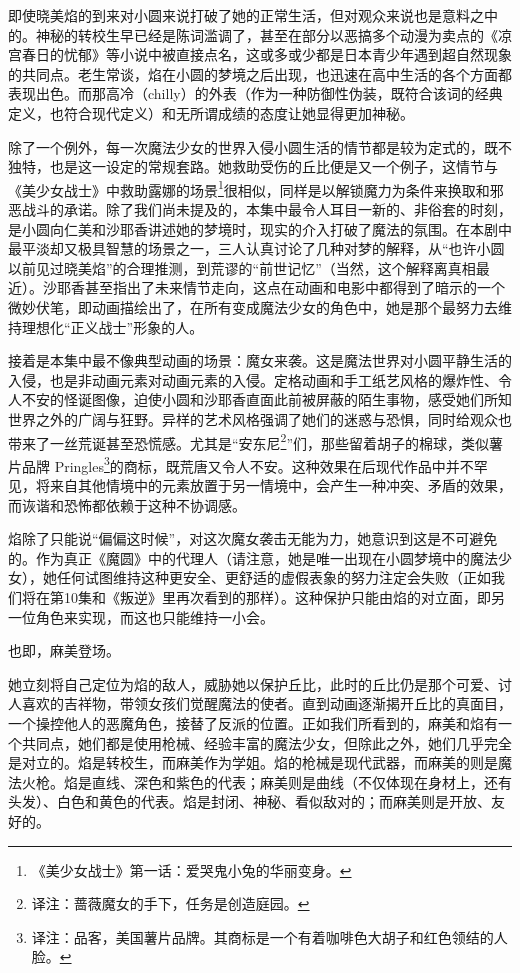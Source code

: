 即使晓美焰的到来对小圆来说打破了她的正常生活，但对观众来说也是意料之中的。神秘的转校生早已经是陈词滥调了，甚至在部分以恶搞多个动漫为卖点的《凉宫春日的忧郁》等小说\cite{ref15}中被直接点名，这或多或少都是日本青少年遇到超自然现象的共同点。老生常谈，焰在小圆的梦境之后出现，也迅速在高中生活的各个方面都表现出色。而那高冷（chilly）的外表（作为一种防御性伪装，既符合该词的经典定义，也符合现代定义）和无所谓成绩的态度让她显得更加神秘。

除了一个例外，每一次魔法少女的世界入侵小圆生活的情节都是较为定式的，既不独特，也是这一设定的常规套路。她救助受伤的丘比便是又一个例子，这情节与《美少女战士》中救助露娜的场景\footnote{《美少女战士》第一话：爱哭鬼小兔的华丽变身。}很相似，同样是以解锁魔力为条件来换取和邪恶战斗的承诺。除了我们尚未提及的，本集中最令人耳目一新的、非俗套的时刻，是小圆向仁美和沙耶香讲述她的梦境时，现实的介入打破了魔法的氛围。在本剧中最平淡却又极具智慧的场景之一，三人认真讨论了几种对梦的解释，从“也许小圆以前见过晓美焰”的合理推测，到荒谬的“前世记忆”（当然，这个解释离真相最近）。沙耶香甚至指出了未来情节走向，这点在动画和电影中都得到了暗示的一个微妙伏笔，即动画描绘出了，在所有变成魔法少女的角色中，她是那个最努力去维持理想化“正义战士”形象的人。

接着是本集中最不像典型动画的场景：魔女来袭。这是魔法世界对小圆平静生活的入侵，也是非动画元素对动画元素的入侵。定格动画和手工纸艺风格的爆炸性、令人不安的怪诞图像，迫使小圆和沙耶香直面此前被屏蔽的陌生事物，感受她们所知世界之外的广阔与狂野。异样的艺术风格强调了她们的迷惑与恐惧，同时给观众也带来了一丝荒诞甚至恐慌感。尤其是“安东尼\footnote{译注：蔷薇魔女的手下，任务是创造庭园。}”们，那些留着胡子的棉球，类似薯片品牌 Pringles\footnote{译注：品客，美国薯片品牌。其商标是一个有着咖啡色大胡子和红色领结的人脸。}的商标，既荒唐又令人不安。这种效果在后现代作品中并不罕见，将来自其他情境中的元素放置于另一情境中，会产生一种冲突、矛盾的效果\cite{ref16}，而诙谐\cite{ref17}和恐怖\cite{ref18}都依赖于这种不协调感。

焰除了只能说“偏偏这时候”，对这次魔女袭击无能为力，她意识到这是不可避免的。作为真正《魔圆》中的代理人（请注意，她是唯一出现在小圆梦境中的魔法少女），她任何试图维持这种更安全、更舒适的虚假表象的努力注定会失败（正如我们将在第10集和《叛逆》里再次看到的那样）。这种保护只能由焰的对立面，即另一位角色来实现，而这也只能维持一小会。

也即，麻美登场。

她立刻将自己定位为焰的敌人，威胁她以保护丘比，此时的丘比仍是那个可爱、讨人喜欢的吉祥物，带领女孩们觉醒魔法的使者。直到动画逐渐揭开丘比的真面目，一个操控他人的恶魔角色，接替了反派的位置。正如我们所看到的，麻美和焰有一个共同点，她们都是使用枪械、经验丰富的魔法少女，但除此之外，她们几乎完全是对立的。焰是转校生，而麻美作为学姐。焰的枪械是现代武器，而麻美的则是魔法火枪。焰是直线、深色和紫色的代表；麻美则是曲线（不仅体现在身材上，还有头发）、白色和黄色的代表。焰是封闭、神秘、看似敌对的；而麻美则是开放、友好的。

